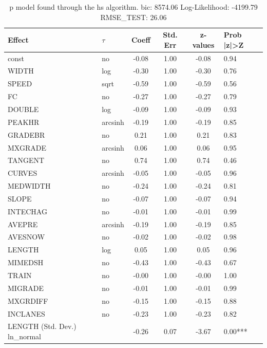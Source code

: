 \begin{table}
	\caption{p model found through the hs algorithm. bic: 8574.06 Log-Likelihood: -4199.79 RMSE_TEST: 26.06}
	\begin{center}
		\begin{tabular}{|l|l|c|c|c|l|}
			\hline
			Effect & $\tau$ & Coeff & Std. Err & z-values & Prob |z|>Z \\
			\hline
			const & no & -0.08 & 1.00 & -0.08 & 0.94 \\
			\hline
			WIDTH & log & -0.30 & 1.00 & -0.30 & 0.76 \\
			\hline
			SPEED & sqrt & -0.59 & 1.00 & -0.59 & 0.56 \\
			\hline
			FC & no & -0.27 & 1.00 & -0.27 & 0.79 \\
			\hline
			DOUBLE & log & -0.09 & 1.00 & -0.09 & 0.93 \\
			\hline
			PEAKHR & arcsinh & -0.19 & 1.00 & -0.19 & 0.85 \\
			\hline
			GRADEBR & no & 0.21 & 1.00 & 0.21 & 0.83 \\
			\hline
			MXGRADE & arcsinh & 0.06 & 1.00 & 0.06 & 0.95 \\
			\hline
			TANGENT & no & 0.74 & 1.00 & 0.74 & 0.46 \\
			\hline
			CURVES & arcsinh & -0.05 & 1.00 & -0.05 & 0.96 \\
			\hline
			MEDWIDTH & no & -0.24 & 1.00 & -0.24 & 0.81 \\
			\hline
			SLOPE & no & -0.07 & 1.00 & -0.07 & 0.94 \\
			\hline
			INTECHAG & no & -0.01 & 1.00 & -0.01 & 0.99 \\
			\hline
			AVEPRE & arcsinh & -0.19 & 1.00 & -0.19 & 0.85 \\
			\hline
			AVESNOW & no & -0.02 & 1.00 & -0.02 & 0.98 \\
			\hline
			LENGTH & log & 0.05 & 1.00 & 0.05 & 0.96 \\
			\hline
			MIMEDSH & no & -0.43 & 1.00 & -0.43 & 0.67 \\
			\hline
			TRAIN & no & -0.00 & 1.00 & -0.00 & 1.00 \\
			\hline
			MIGRADE & no & -0.01 & 1.00 & -0.01 & 0.99 \\
			\hline
			MXGRDIFF & no & -0.15 & 1.00 & -0.15 & 0.88 \\
			\hline
			INCLANES & no & -0.23 & 1.00 & -0.23 & 0.82 \\
			\hline
			LENGTH (Std. Dev.) ln_normal &  & -0.26 & 0.07 & -3.67 & 0.00*** \\

\end{tabular}
\end{center}
\end{table}
